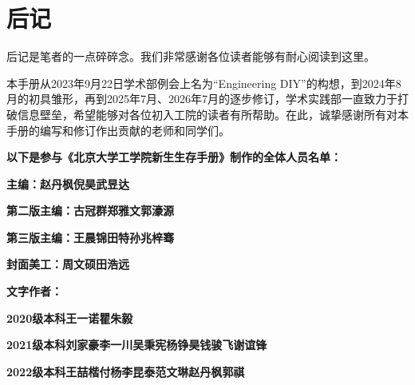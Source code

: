 \backmatter

\chapter*{后记}
后记是笔者的一点碎碎念。我们非常感谢各位读者能够有耐心阅读到这里。

\vspace{10pt}

本手册从2023年9月22日学术部例会上名为“Engineering DIY”的构想，到2024年8月的初具雏形，再到2025年7月、2026年7月的逐步修订，学术实践部一直致力于打破信息壁垒，希望能够对各位初入工院的读者有所帮助。在此，诚挚感谢所有对本手册的编写和修订作出贡献的老师和同学们。

\vspace{10pt}

\textbf{以下是参与《北京大学工学院新生生存手册》制作的全体人员名单：}

\textbf{主编：赵丹枫\hspace{6pt}倪\hspace{11pt}昊\hspace{6pt}武昱达}

\textbf{第二版主编：古冠群\hspace{6pt}郑雅文\hspace{6pt}郭濠源}

\textbf{第三版主编：王晨锦\hspace{6pt}田\hspace{11pt}特\hspace{6pt}孙兆梓骞}

\textbf{封面美工：周文硕\hspace{6pt}田浩远}

\textbf{文字作者：}

\textbf{2020级本科\hspace{20pt}王一诺\hspace{6pt}瞿朱毅}

\textbf{2021级本科\hspace{20pt}刘家豪\hspace{6pt}李一川\hspace{6pt}吴秉宪\hspace{6pt}杨铮昊\hspace{6pt}钱骏飞\hspace{6pt}谢谊锋}

\textbf{2022级本科\hspace{20pt}王喆楷\hspace{6pt}付\hspace{11pt}杨\hspace{6pt}李昆泰\hspace{6pt}范文琳\hspace{6pt}赵丹枫\hspace{6pt}郭\hspace{11pt}祺}

